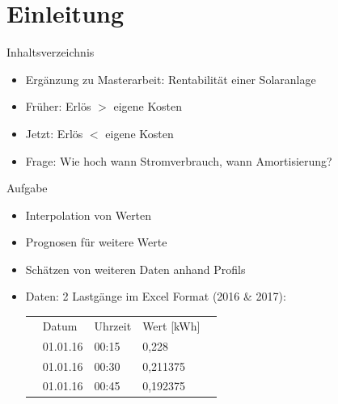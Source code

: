 
\section{Einleitung}
\begin{frame}{Inhaltsverzeichnis}
\tableofcontents[currentsection]
\end{frame}


\begin{frame}{\insertsectionhead}
	\begin{itemize}
		\item Ergänzung zu Masterarbeit: Rentabilität einer Solaranlage
		\item Früher: Erlös $>$ eigene Kosten
		\item Jetzt: Erlös $<$ eigene Kosten
		\item Frage: Wie hoch wann Stromverbrauch, wann Amortisierung?
	\end{itemize}
\end{frame}

\begin{frame}{Aufgabe}
\begin{itemize}
	\item Interpolation von Werten
	\item Prognosen für weitere Werte
	\item Schätzen von weiteren Daten anhand Profils
	\bigskip
	\item Daten: 2 Lastgänge im Excel Format (2016 \& 2017):
	
\begin{table}[]
	\begin{tabular}{lllll}
		& Datum    & Uhrzeit & Wert [kWh] &  \\
		& 01.01.16 & 00:15   & 0,228      &  \\
		& 01.01.16 & 00:30   & 0,211375   &  \\
		& 01.01.16 & 00:45   & 0,192375   & 
	\end{tabular}
\end{table}
	
\end{itemize}
\end{frame}

